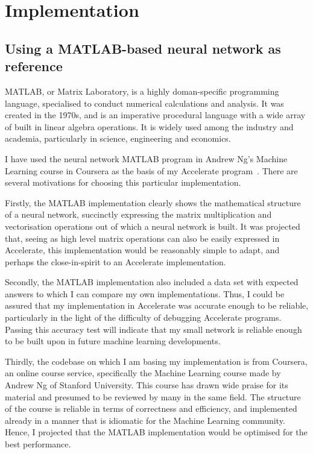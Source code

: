 \newcommand{\liam}[1]{$\langle$ \textit{\textbf{Liam} #1} $\rangle\ $}
\chapter{Implementation}\label{ch:impl}

\section{Using a MATLAB-based neural network as reference} \label{se:impl.matlab.nn}

MATLAB, or Matrix Laboratory, is a highly doman-specific programming language, specialised to conduct numerical calculations and analysis. It was created in the 1970s, and is an imperative procedural language with a wide array of built in linear algebra operations. It is widely used among the industry and academia, particularly in science, engineering and economics.

I have used the neural network MATLAB program in Andrew Ng's Machine Learning course in Coursera as the basis of my Accelerate program~\cite{Ng12}. There are several motivations for choosing this particular implementation. 

Firstly, the MATLAB implementation clearly shows the mathematical structure of a neural network, succinctly expressing the matrix multiplication and vectorisation operations out of which a neural network is built. It was projected that, seeing as high level matrix operations can also be easily expressed in Accelerate, this implementation would be reasonably simple to adapt, and perhaps the close-in-spirit to an Accelerate implementation.

Secondly, the MATLAB implementation also included a data set with expected answers to which I can compare my own implementations. Thus, I could be assured that my implementation in Accelerate was accurate enough to be reliable, particularly in the light of the difficulty of debugging Accelerate programs. Passing this accuracy test will indicate that my small network is reliable enough to be built upon in future machine learning developments.

Thirdly, the codebase on which I am basing my implementation is from Coursera, an online course service, specifically the Machine Learning course made by Andrew Ng of Stanford University. This course has drawn wide praise for its material and presumed to be reviewed by many in the same field. The structure of the course is reliable in terms of correctness and efficiency, and implemented already in a manner that is idiomatic for the Machine Learning community. Hence, I projected that the MATLAB implementation would be optimised for the best performance.

